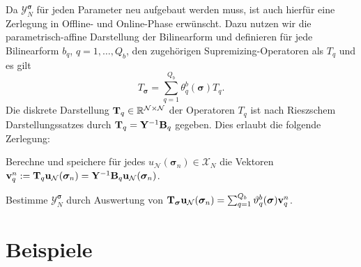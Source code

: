 \documentclass[../main.tex]{subfiles}
\begin{document}
Da $\mathcal Y_{N}^{\bm \sigma}$ für jeden Parameter neu aufgebaut werden muss, ist auch hierfür eine Zerlegung in Offline- und Online-Phase erwünscht.
Dazu nutzen wir die parametrisch-affine Darstellung der Bilinearform und definieren für jede Bilinearform $b_{q}$, $q = 1, \dots, Q_b$, den zugehörigen Supremizing-Operatoren als $T_{q}$ und es gilt
\begin{equation}
    T_{\bm \sigma} = \sum_{q = 1}^{Q_b} \theta_{q}^{b}(\bm \sigma) T_{q}.
\end{equation}
Die diskrete Darstellung $\mathbf{T}_{q} \in \mathbb{R}^{\mathcal N \times \mathcal N}$ der Operatoren $T_q$ ist nach Rieszschem Darstellungssatzes durch $\mathbf{T}_{q} = \mathbf{Y}^{-1} \mathbf{B}_{q}$ gegeben.
Dies erlaubt die folgende Zerlegung:

\begin{description}[font=\normalfont\itshape]
    \item[Offline:]Berechne und speichere für jedes $u_{\mathcal N}(\bm \sigma_{n}) \in \mathcal X_{N}$ die Vektoren $\mathbf{v}_{q}^{n} := \mathbf{T}_{q} \mathbf{u}_{\mathcal N}(\bm \sigma_{n}) = \mathbf{Y}^{-1} \mathbf{B}_{q} \mathbf{u}_{\mathcal N}(\bm \sigma_{n})$.
    \item[Online:] Bestimme $\mathcal Y_{N}^{\bm \sigma}$ durch Auswertung von $\mathbf{T}_{\bm \sigma} \mathbf{u}_{\mathcal N}(\bm \sigma_{n}) = \sum_{q = 1}^{Q_b} \vartheta_{q}^{b}(\bm \sigma) \mathbf{v}_{q}^{n}$.
\end{description}


\section{Beispiele} %
\label{sec:cha5_rbm:beispiele}

\end{document}
